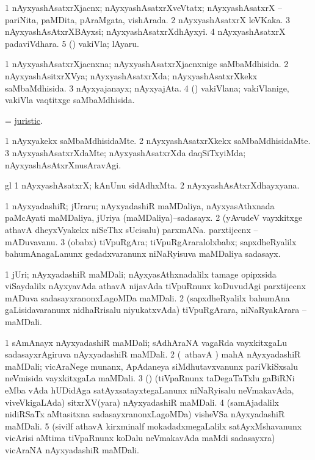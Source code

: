 \bentry
{}
\gl{\nA}
\bmng
\bnum
\num{1} nAyxyashAsatxrXjacnx; nAyxyashAsatxrXveVtatx; nAyxyashAsatxrX -- pariNita, paMDita, pAraMgata, vishArada. 
\num{2} nAyxyashAsatxrX leVKaka. 
\num{3} nAyxyashAsAtxrXBAyxsi; nAyxyashAsatxrXdhAyxyi. 
\num{4} nAyxyashAsatxrX padaviVdhara. 
\num{5} (\ame) vakiVla; lAyaru. 
\enum
\emng
\eentry

\bentry
{}
\gl{\gu}
\bmng
\bnum
\num{1} nAyxyashAsatxrXjacnxna; nAyxyashAsatxrXjacnxnige saMbaMdhisida. 
\num{2} nAyxyashAsitxrXVya; nAyxyashAsatxrXda; nAyxyashAsatxrXkekx saMbaMdhisida. 
\num{3} nAyxyajanayx; nAyxyajAta. 
\num{4} (\ame) vakiVlana; vakiVlanige, vakiVla vaqtitxge saMbaMdhisida. 
\enum
\emng
\eentry

\bentry
{}
\gl{\gu}
\bmng
 = \hyperlink{juristic}{juristic}. 
\emng
\eentry

\bentry
{}
\gl{\kirxvi}
\bmng
\bnum
\num{1} nAyxyakekx saMbaMdhisidaMte. 
\num{2} nAyxyashAsatxrXkekx saMbaMdhisidaMte. 
\num{3} nAyxyashAsatxrXdaMte; nAyxyashAsatxrXda daqSiTxyiMda; nAyxyashAsAtxrXnusAravAgi. 
\enum
\emng
\eentry

\bentry
{}
gl{\nA}\bmng
\bnum
\num{1} nAyxyashAsatxrX; kAnUnu sidAdhxMta. 
\num{2} nAyxyashAsAtxrXdhayxyana. 
\enum
\emng
\eentry

\bentry
{}
\gl{\nA}
\bmng
\bnum
\num{1} nAyxyadashiR; jUraru; nAyxyadashiR maMDaliya, nAyxyasAthxnada paMcAyati maMDaliya, jUriya (maMDaliya)--sadasayx. 
\num{2} (yAvudeV vayxkitxge athavA dheyxVyakekx niSeThx sUcisalu) parxmANa. parxtijecnx -- mADuvavanu. 
\num{3} (obabx) tiVpuRgAra; tiVpuRgAraralolxbabx; sapxdheRyalilx bahumAnagaLanunx gedadxvaranunx niNaRyisuva maMDaliya sadasayx. 
\enum
\emng
\eentry

\bentry
{}
\gl{\nA}
\bmng
\bnum
\num{1} jUri; nAyxyadashiR maMDali; nAyxyasAthxnadalilx tamage opipxsida viSaydalilx nAyxyavAda athavA nijavAda tiVpuRnunx koDuvudAgi parxtijecnx mADuva sadasayxranonxLagoMDa maMDali. 
\num{2} (sapxdheRyalilx bahumAna gaLisidavaranunx nidhaRrisalu niyukatxvAda) tiVpuRgArara, niNaRyakArara -- maMDali. 
\enum
\emng

\noindent
\gl{\pagu}
\bmng
\bnum
\num{1}  sAmAnayx nAyxyadashiR maMDali; sAdhAraNA vagaRda vayxkitxgaLu sadasayxrAgiruva nAyxyadashiR maMDali. 
\num{2}  (\ca\ athavA \ame) mahA nAyxyadashiR maMDali; vicAraNege munanx, ApAdaneya siMdhutavxvanunx pariVkiSxsalu neVmisida vayxkitxgaLa maMDali. 
\num{3}  (\ca) (tiVpaRnunx taDegaTaTxlu gaBiRNi eMba vAda hUDidAga satAyxsatayxtegaLanunx niNaRyisalu neVmakavAda, viveVkigaLAda) sitxrXV(yara) nAyxyadashiR maMDali. 
\num{4}  (samAjadalilx nidiRSaTx aMtasitxna sadasayxranonxLagoMDa) visheVSa nAyxyadashiR maMDali. 
\num{5}  (sivilf athavA kirxminalf mokadadxmegaLalilx satAyxMshavanunx vicArisi aMtima tiVpaRnunx koDalu neVmakavAda  maMdi sadasayxra) vicAraNA nAyxyadashiR maMDali. 
\enum
\emng
\eentry

